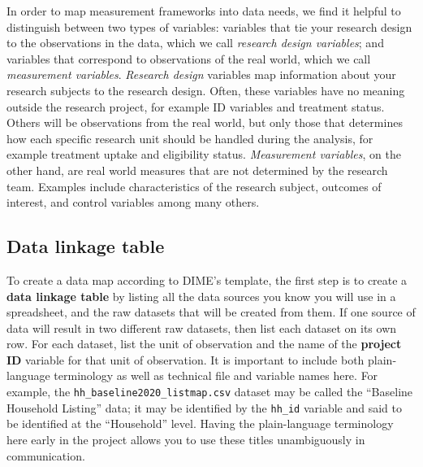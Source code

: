 In order to map measurement frameworks into data needs,
we find it helpful to distinguish between two types of variables:
variables that tie your research design
to the observations in the data,
which we call \textit{research design variables};
and variables that correspond to observations of the real world,
which we call \textit{measurement variables}.
\textit{Research design} variables map information about your research subjects to the
research design.
Often, these variables have no meaning outside the research project,
for example ID variables and treatment status.
Others will be observations from the real world, 
but only those that determines how each specific research unit 
should be handled during the analysis, 
for example treatment uptake and eligibility status.
\textit{Measurement variables}, on the other hand,
are real world measures that are not determined by the research team.
Examples include characteristics of the research subject,
outcomes of interest, and control variables among many others.



\subsection{Data linkage table}

To create a data map according to DIME's template,
the first step is to create a \textbf{data linkage table} by listing
all the data sources you know you will use in a spreadsheet,
and the raw datasets that will be created from them.
If one source of data will result in two different raw datasets,
then list each dataset on its own row.
For each dataset, list the unit of observation
and the name of the \textbf{project ID}
variable for that unit of observation.
It is important to include both plain-language terminology
as well as technical file and variable names here.
For example, the \texttt{hh\_baseline2020\_listmap.csv} dataset
may be called the ``Baseline Household Listing'' data;
it may be identified by the \texttt{hh\_id} variable
and said to be identified at the ``Household'' level.
Having the plain-language terminology here early in the project
allows you to use these titles unambiguously in communication.

